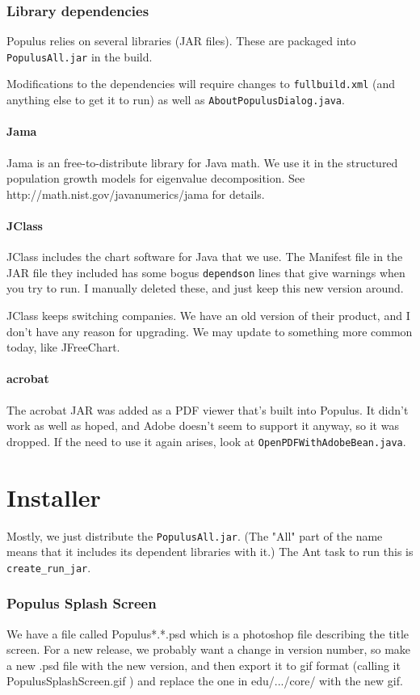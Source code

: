 \documentclass[12pt]{article}
\begin{document}
\section{Library dependencies}
Populus relies on several libraries (JAR files).  These are packaged into \texttt{PopulusAll.jar} in the build.

Modifications to the dependencies will require changes to \texttt{fullbuild.xml} (and anything else to get it to run) as well as \texttt{AboutPopulusDialog.java}.

\subsection{Jama}
Jama is an free-to-distribute library for Java math.  We use it in the structured population growth models for eigenvalue decomposition.  See http://math.nist.gov/javanumerics/jama for details.

\subsection{JClass}
JClass includes the chart software for Java that we use.  The Manifest file in the JAR file they included has some bogus \texttt{dependson}  lines that give warnings when you try to run.  I manually deleted these, and just keep this new version around.

JClass keeps switching companies.  We have an old version of their product, and I don't have any reason for upgrading.  We may update to something more common today, like JFreeChart.

\subsection{acrobat}
The acrobat JAR was added as a PDF viewer that's built into Populus.  It didn't work as well as hoped, and Adobe doesn't seem to support it anyway, so it was dropped.  If the need to use it again arises, look at \texttt{OpenPDFWithAdobeBean.java}.


\part{Installer}
Mostly, we just distribute the \texttt{PopulusAll.jar}. (The "All" part of the name means that it includes its dependent libraries with it.)  The Ant task to run this is \texttt{create\_run\_jar}.
 
\section{Populus Splash Screen}
We have a file called Populus*.*.psd which is a photoshop file describing the title screen. For a new release, we probably want a change in version number, so make a new .psd file with the new version, and then export it to gif format (calling it PopulusSplashScreen.gif ) and replace the one in edu/.../core/ with the new gif.
\end{document}
